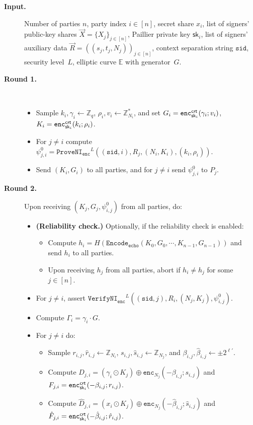\documentclass[11pt]{article}
\def\crt{{\sf crt}}
\newcommand{\enc}{\ensuremath{\mathtt{enc}}}
\newcommand{\enci}[1]{\ensuremath{\mathtt{enc}_{N_{#1}}}}
\newcommand{\sid}{\ensuremath{\mathtt{sid}}}
\newcommand{\proveni}[1]{\ensuremath{\mathtt{ProveNI}_{\mathtt{#1}}}}
\newcommand{\verifyni}[1]{\ensuremath{\mathtt{VerifyNI}_{\mathtt{#1}}}}
\newcommand{\Encode}[1]{\ensuremath{\mathtt{Encode}_{\mathtt{#1}}}}
\newcommand{\sk}{\textsf{sk}}
\newcommand{\pk}{\textsf{pk}}
\newcommand{\E}{\mathbb{E}}
\newcommand{\Z}{\mathbb{Z}}
\newcommand{\?}[1]{\stackrel{?}{#1}}
\begin{document}
\begin{description}
    \item[\textbf{Input.}] Number of parties $n$, party index $i\in [n]$, secret share $x_i$, list of signers' public-key shares $\vec X = \{X_j\}_{j \in [n]}$, 
    Paillier private key $\sk_i$, list of signers' auxiliary data $\vec R = ((s_j, t_j, N_j))_{j\in[n]}$, context separation string $\sid$, security level~$L$, elliptic curve $\E$ with generator~$G$.

    \item[\textbf{Round 1.}] \
    \begin{itemize}
        \item Sample $k_i, \gamma_i \gets \Z_q$, $\rho_i, v_i \gets \Z^*_{N_i}$, and set $G_i = \enc^\crt_{\sk_i}(\gamma_i; v_i)$,
            $K_i = \enc^\crt_{\sk_i}(k_i; \rho_i)$. 
        \item For $j \ne i$ compute $\psi^0_{j,i} = \proveni{enc}^{L}((\sid, i), R_j, (N_i, K_i), (k_i, \rho_i))$. 
        \item Send $(K_i, G_i)$ to all parties, and for $j \neq i$ send $\psi^0_{j,i}$ to $P_j$.
    \end{itemize}


    \item[\textbf{Round 2.}] Upon receiving $(K_j, G_j, \psi^0_{i,j})$ from all parties, do:
    \begin{itemize}
     \item {\bf (Reliability check.)} Optionally, if the reliability check is enabled:
    \begin{itemize}
        \item Compute $h_i = H(\Encode{echo}(K_0, G_0, \cdots, K_{n-1}, G_{n-1}))$
        and 
        send $h_i$ to all parties.
        
        \item Upon receiving $h_j$ from all parties, abort if 
        $h_i \neq h_j$ for some $j \in [n]$.
    \end{itemize}
        \item For $j \neq i$, assert $\verifyni{enc}^{L}((\sid, j), R_i, (N_j, K_j), \psi^0_{i,j})$. 
        
        \item Compute $\Gamma_i = \gamma_i \cdot G$.
        \item For $j \neq i$ do:
        \begin{itemize}
            \item Sample $r_{i,j}, \hat{r}_{i,j} \gets \Z_{N_i}$,
                $s_{i,j}, \hat{s}_{i,j} \gets \Z_{N_j}$, and
                $\beta_{i,j}, \hat{\beta}_{i,j} \gets \pm 2^{\ell'}$.
            \item Compute $D_{j,i} = (\gamma_i \odot K_j) \oplus \enci{j}(-\beta_{i,j}; s_{i,j})$
                and $F_{j,i} = \enc^\crt_{\sk_i}(-\beta_{i,j}; r_{i,j})$.
            \item Compute $\hat{D}_{j,i} = (x_i \odot K_j) \oplus \enci{j}(-\hat{\beta}_{i,j}; \hat{s}_{i,j})$
                and $\hat{F}_{j,i} = \enc^\crt_{\sk_i}(-\hat{\beta}_{i,j}; \hat{r}_{i,j})$.


\end{itemize}
\end{itemize}
\end{description}
\end{document}

